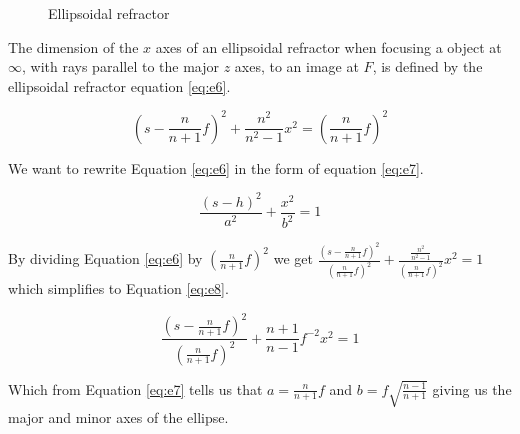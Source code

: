 \documentclass[main.tex]{subfiles}
\begin{document}
\begin{figure}
\centering{}
\caption{Ellipsoidal refractor}
\label{fig:3}
\end{figure}

The dimension of the $x$ axes of an ellipsoidal refractor when focusing a object at $\infty$, with rays parallel to the major $z$ axes, to an image at $F$, is defined by the ellipsoidal refractor equation \ref{eq:e6}.

\begin{equation}\label{eq:e6}
\left(s-\frac{n}{n+1}f \right)^2 + \frac{n^2}{n^2 - 1}x^2 = \left(\frac{n}{n+1}f \right)^2
\end{equation}

We want to rewrite Equation \ref{eq:e6} in the form of equation \ref{eq:e7}.

\begin{equation}\label{eq:e7}
\frac{(s-h)^2}{a^2} + \frac{x^2}{b^2} = 1 
\end{equation}

By dividing Equation \ref{eq:e6} by $\left(\frac{n}{n+1}f\right)^2$ we get $\frac{\left(s-\frac{n}{n+1}f \right)^2}{\left(\frac{n}{n+1}f\right)^2} + \frac{\frac{n^2}{n^2 - 1}}{\left(\frac{n}{n+1}f\right)^2}x^2 = 1$ which simplifies to Equation \ref{eq:e8}.

\begin{equation}\label{eq:e8}
\frac{\left(s-\frac{n}{n+1}f \right)^2}{\left(\frac{n}{n+1}f\right)^2} + 
\frac{n + 1}{n-1} f^{-2} x^2 = 1
\end{equation}

Which from Equation \ref{eq:e7} tells us that $a=\frac{n}{n+1}f$ and $b=f \sqrt{\frac{n-1}{n+1}}$ giving us the major and minor axes of the ellipse.
\end{document}
